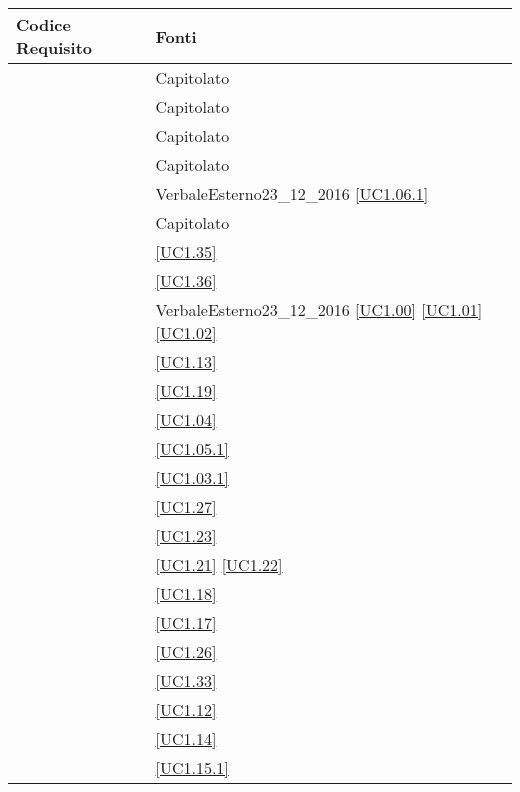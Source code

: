 \begin{longtable}{|P{6cm}|P{6cm}|}
	\hline \textbf{Codice Requisito} & \textbf{Fonti}\\
	\hline {} & Capitolato \\
	\hline {} & Capitolato \\
	\hline {} & Capitolato \\
	\hline {} & Capitolato \\
	\hline {} & VerbaleEsterno23\_12\_2016 \linebreak \ref{UC1.06.1}  \\	
	\hline {} & Capitolato \\
	\hline {} & \ref{UC1.35} \\
	\hline {} & \ref{UC1.36} \\
	\hline {} & VerbaleEsterno23\_12\_2016 \linebreak \ref{UC1.00} \linebreak \ref{UC1.01} \linebreak \ref{UC1.02} \\
	\hline {} & \ref{UC1.13} \\
	\hline {} & \ref{UC1.19} \\
	\hline {} & \ref{UC1.04}  \\
	\hline {} & \ref{UC1.05.1} \\
	\hline {} & \ref{UC1.03.1} \\
	\hline {} & \ref{UC1.27} \\
	\hline {} & \ref{UC1.23} \\
	\hline {} & \ref{UC1.21} \linebreak \ref{UC1.22} \\
	\hline {} & \ref{UC1.18} \\
	\hline {} & \ref{UC1.17} \\
	\hline {} & \ref{UC1.26} \\
	\hline {} & \ref{UC1.33} \\
	\hline {} & \ref{UC1.12} \\
	\hline {} & \ref{UC1.14} \\
	\hline {} & \ref{UC1.15.1} \\

\end{longtable}
